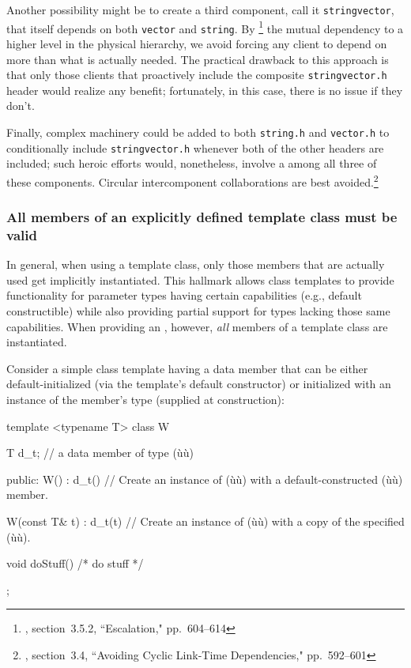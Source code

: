 Another possibility might be to create a third component, call it
\lstinline!stringvector!, that itself depends on both \lstinline!vector!
and \lstinline!string!. By
\footnote{\cite{lakos20}, section~3.5.2, ``Escalation," pp.~604--614} the mutual dependency
to a higher level in the physical hierarchy, we avoid forcing any client
to depend on more than what is actually needed. The practical drawback
to this approach is that only those clients that proactively include the
composite \lstinline!stringvector.h! header would realize any benefit;
fortunately, in this case, there is no  issue if they don't.

Finally, complex machinery could be added to both \lstinline!string.h! and
\lstinline!vector.h! to conditionally include \lstinline!stringvector.h!
whenever both of the other headers are included; such heroic efforts
would, nonetheless, involve a  among
all three of these components. Circular intercomponent collaborations
are best avoided.\footnote{\cite{lakos20}, section~3.4, ``Avoiding Cyclic Link-Time Dependencies," pp.~592--601}

\subsubsection[All members of an explicitly defined template class must be valid]{All members of an explicitly defined template class must be valid}\label{all-members-of-an-explicitly-defined-template-class-must-be-valid}

In general, when using a template class, only those members that are
actually used get implicitly instantiated. This hallmark allows class
templates to provide functionality for parameter types having certain
capabilities (e.g., default constructible) while also providing partial
support for types lacking those same capabilities. When providing an
, however, \emph{all}
members of a template class are instantiated.

Consider a simple class template having a data member that can be either
default-initialized (via the template's default constructor) or
initialized with an instance of the member's type (supplied at
construction):

\begin{emcppslisting}[emcppsbatch=e8]
template <typename T>
class W
{
    T d_t;  // a data member of type (ù{}ù)

public:
    W() : d_t() {}
        // Create an instance of (ù{}ù) with a default-constructed (ù{}ù) member.

    W(const T& t) : d_t(t) {}
        // Create an instance of (ù{}ù) with a copy of the specified (ù{}ù).

    void doStuff() { /* do stuff */ }
};
\end{emcppslisting}

